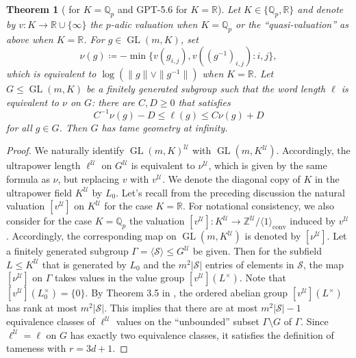 \documentclass[12pt,nosumlimits,nonamelimits]{amsart}
\newtheorem{thm}{Theorem}
\theoremstyle{remark}
\theoremstyle{definition}
\newcommand{\IQ}{\mathbb{Q}}
\newcommand{\IR}{\mathbb{R}}
\newcommand{\IZ}{\mathbb{Z}}
\newcommand{\cS}{\mathcal{S}}
\newcommand{\cU}{\mathcal{U}}
\newcommand{\Ga}{\Gamma}
\DeclareMathOperator{\GL}{GL}
\DeclareMathOperator{\conv}{conv}
\newcommand{\ip}[1]{\mathopen{\langle}#1\mathclose{\rangle}}
\begin{document}
\begin{thm}[\cite{guirardel} for $K=\IQ_p$ 
and GPT-5.6 for $K=\IR$]\label{thm:tame}
Let $K\in\{\IQ_p,\IR\}$ and 
denote by $v\colon K\to \IR\cup\{\infty\}$ 
the $p$-adic valuation when $K=\IQ_p$ or 
the ``quasi-valuation'' as above when $K=\IR$. 
For $g \in \GL(m,K)$, set 
\[
\nu(g) \coloneq -\min\{ v(g_{i,j}), v((g^{-1})_{i,j}) : i,j\},
\]
which is equivalent to $\log(\|g\|\vee\|g^{-1}\|)$ when $K=\IR$.
Let $G\le \GL(m,K)$ be a finitely generated subgroup 
such that the word length $\ell$ is equivalent 
to $\nu$ on $G$:  
there are $C,D\geq0$ that satisfies 
\[
C^{-1}\nu(g) - D \le \ell(g) \le C\nu(g) + D
\]
for all $g\in G$. 
Then $G$ has tame geometry at infinity.
\end{thm}
\begin{proof}
We naturally identify $\GL(m,K)^\cU$ 
with $\GL(m,K^\cU)$. 
Accordingly, the ultrapower length $\ell^\cU$ 
on $G^\cU$ is equivalent to $\nu^\cU$, 
which is given by the same 
formula as $\nu$, but replacing $v$ with $v^\cU$. 
We denote the diagonal copy of $K$ 
in the ultrapower field $K^\cU$ by $L_0$. 
Let's recall from the preceding discussion 
the natural valuation $[v^\cU]$ 
on $K^\cU$ for the case $K=\IR$. 
For notational consistency, 
we also consider for the case $K=\IQ_p$ the valuation 
$[v^\cU]\colon K^\cU\to\IZ^\cU/\ip{1}_{\conv}$ 
induced by $v^\cU$. 
Accordingly, the corresponding map on $\GL(m,K^\cU)$ 
is denoted by $[\nu^\cU]$. 
Let a finitely generated subgroup 
$\Ga =\ip{\cS}\le G^\cU$ be given. 
Then for the subfield $L\le K^\cU$ 
that is generated by $L_0$ and the 
$m^2|\cS|$ entries of elements in $\cS$, 
the map $[\nu^\cU]$ on $\Ga$ 
takes values in the value group $[v^\cU](L^{\times})$. 
Note that $[v^\cU](L_0^{\times})=\{0\}$. 
By Theorem 3.5 in \cite{guirardel}, the ordered abelian 
group $[v^\cU](L^{\times})$ has rank 
at most $m^2|\cS|$. 
This implies that there are at most $m^2|\cS|-1$
equivalence classes 
of $\ell^\cU$ values on the ``unbounded'' 
subset $\Ga\setminus G$ of $\Ga$. 
Since $\ell^\cU=\ell$ on $G$ has 
exactly two equivalence classes, 
it satisfies the definition of tameness with $r = 3d+1$. 
\end{proof}
\end{document}

